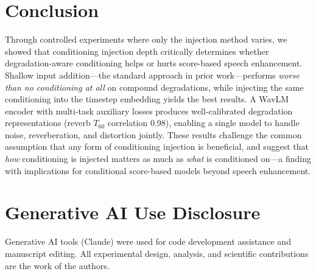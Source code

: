 \documentclass[cameraready]{Interspeech}
\begin{document}
\section{Conclusion}

Through controlled experiments where only the injection method varies, we showed that conditioning injection depth critically determines whether degradation-aware conditioning helps or hurts score-based speech enhancement.
Shallow input addition---the standard approach in prior work---performs \textit{worse than no conditioning at all} on compound degradations, while injecting the same conditioning into the timestep embedding yields the best results.
A WavLM encoder with multi-task auxiliary losses produces well-calibrated degradation representations (reverb $T_{60}$ correlation 0.98), enabling a single model to handle noise, reverberation, and distortion jointly.
These results challenge the common assumption that any form of conditioning injection is beneficial, and suggest that \textit{how} conditioning is injected matters as much as \textit{what} is conditioned on---a finding with implications for conditional score-based models beyond speech enhancement.


\section{Generative AI Use Disclosure}
Generative AI tools (Claude) were used for code development assistance and manuscript editing.
All experimental design, analysis, and scientific contributions are the work of the authors.




\end{document}
